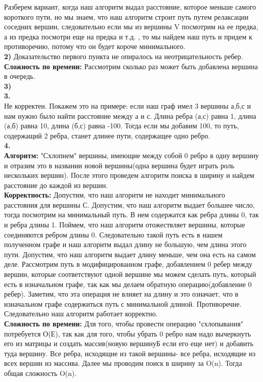 \documentclass[a4paper,12pt]{article}
\begin{document}
Разберем вариант, когда наш алгоритм выдал расстояние, которое меньше самого короткого пути, но мы знаем, что наш алгоритм строит путь путем релаксации соседних вершин, следовательно если мы из вершины V посмотрим на ее предка, а из предка посмотри еще на предка и т.д. , то мы найдем наш путь и придем к противоречию, потому что он будет короче минимального.\\
\textbf{2)} Доказательство первого пункта не опиралось на неотрицательность ребер.\\
\textbf{Сложность по времени:} Рассмотрим сколько раз может быть добавлена вершина в очередь.\\
\textbf{3)} \\
\textbf{3.}\\
Не корректен. Покажем это на примере: если наш граф имел 3 вершины а,б,с и нам нужно было найти расстояние между а и с. Длина ребра (а,с) равна 1, длина (а,б) равна 10, длина (б,с) равна -100. Тогда если мы добавим 100, то путь, содержащий 2 ребра, станет длинее пути, содержащее одно ребро.\\
\textbf{4.}\\
\textbf{Алгоритм:} "Схлопнем" вершины, имеющие между собой 0 ребро в одну вершину и отразим это в названии новой вершины(одна вершина будет играть роль нескольких вершин). После этого проведем алгоритм поиска в ширину и найдем расстояние до каждой из вершин.\\
\textbf{Корректность:} Допустим, что наш алгоритм не находит минимального расстояния для вершины С. Допустим, что наш алгоритм выдает большее число, тогда посмотрим на минимальный путь. В нем содержатся как ребра длины 0, так и ребра длины 1. Поймем, что наш алгоритм отожествляет вершины, которые соединяются ребром длины 0. Следовательно такой путь есть в нашем полученном графе и наш алгоритм выдал длину не большую, чем длина этого пути. Допустим, что наш алгоритм выдает длину меньше, чем она есть на самом деле. Рассмотрим путь в модифицированном графе, добавлением 0 ребер между вершин, которые соответствуют одной вершине мы можем сделать путь, который есть в изначальном графе, так как мы делаем обратную операцию(добавление 0 ребер). Заметим, что эта операция не влияет на длину и это означает, что в изначальном графе содержиться путь с минимальной длиной. Противоречие. Следовательно наш алгоритм работает корректно.\\
\textbf{Сложность по времени:} Для того, чтобы провести операцию "схлопывания" потребуется О(Е), так как для того, чтобы убрать 0 ребро нам надо вычеркнуть его из матрицы и создать массив(новую вершинуБ если его еще нет) и добавить туда вершину.  Все ребра, исходящие из такой вершины- все ребра, исходящие из всех вершин из массива. Далее мы проводим поиск в ширину за O(n). Тогда общая сложность O(n).\\
\end{document}
